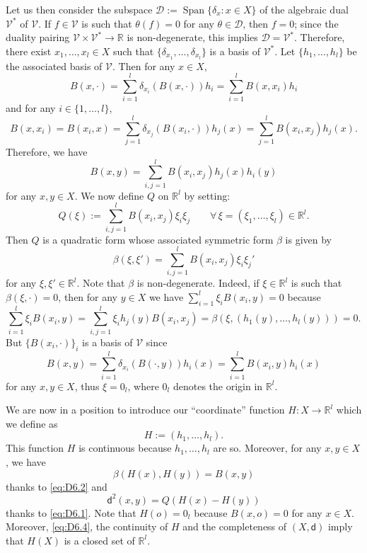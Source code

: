 \documentclass[10pt]{amsart}
\theoremstyle{plain}
\theoremstyle{definition}
\newcommand{\setR}{\mathbb{R}}
\newcommand{\cV}{\mathcal{V}}
\newcommand{\cD}{\mathcal{D}}
\newcommand{\dist}{\mathsf{d}}
\DeclareMathOperator{\Span}{Span}
\begin{document}
Let us then consider the subspace $\mathcal{D}:=\Span\{\delta_x: x \in X\}$ of the algebraic dual~$\cV^*$ of $\cV$. If $f \in \cV$ is such that $\theta(f)=0$ for any $\theta \in \cD$, then $f=0$; since the duality pairing $\cV\times\cV^* \to\setR$ is non-degenerate, this implies $\cD = \cV^*$. Therefore, there exist $x_1,\dots, x_l \in X$ such that $\{\delta_{x_1},\dots,\delta_{x_l}\}$ is a basis of $\mathcal{V}^*$. Let $\{h_1,\dots,h_l\}$ be the associated basis of $\mathcal{V}$. Then for any $x \in X$,
\begin{equation}\label{eq:basis}
B(x,\cdot) = \sum_{i=1}^l \delta_{x_i}(B(x,\cdot)) h_i = \sum_{i=1}^l B(x,x_i) h_i
\end{equation}
and for any $i \in \{1,\dots,l\}$,
\[
B(x,x_i) = B(x_i,x) = \sum_{j=1}^l \delta_{x_j}(B(x_i,\cdot)) h_j(x)= \sum_{j=1}^l B(x_i,x_j)h_j(x).
\]
Therefore, we have
\begin{equation}\label{eq:D6.2}
B(x,y) = \sum_{i,j=1}^l B(x_i,x_j)h_j(x)h_i(y)
\end{equation}
for any $x,y \in X$. We now define $Q$ on $\setR^l$ by setting:
\[
Q(\xi):= \sum_{i,j=1}^lB(x_i,x_j)\xi_i \xi_j \qquad \forall \, \xi=(\xi_1,\dots,\xi_l) \in \setR^l.
\]
Then $Q$ is a quadratic form whose associated symmetric form $\beta$ is given by
\[
\beta(\xi,\xi') = \sum_{i,j=1}^l B(x_i,x_j)\xi_i \xi_j'
\]
for any $\xi, \xi' \in \setR^l$. Note that $\beta$ is non-degenerate. Indeed, if $\xi \in \setR^l $ is such that $\beta(\xi,\cdot)=0$, then for any $y \in X$ we have $\sum_{i=1}^l \xi_i B(x_i,y)=0$ because
\[
\sum_{i=1}^l \xi_i B(x_i,y)=\sum_{i,j=1}^l \xi_i h_j(y)B(x_i,x_j)=\beta(\xi,(h_1(y),\ldots,h_l(y)))=0.
\]
But $\{B(x_i,\cdot)\}_i$ is a basis of $\cV$ since
\[
B(x,y)=\sum_{i=1}^l \delta_{x_i}(B(\cdot,y))h_i(x)= \sum_{i=1}^l B(x_i,y)h_i(x)
\]
for any $x,y \in X$, thus $\xi=0_l$, where $0_l$ denotes the origin in $\setR^l$.

We are now in a position to introduce our ``coordinate'' function $H:X\to\setR^l$ which we define as
\[
H:=(h_1,\dots,h_l).
\]
This function $H$ is continuous because $h_1,\dots,h_l$ are so. Moreover, for any $x,y \in X$, we have
\begin{equation}\label{eq:D6.3}
\beta(H(x),H(y)) = B(x,y)
\end{equation}
thanks to \eqref{eq:D6.2} and
\begin{equation}\label{eq:D6.4}
\dist^2(x,y) = Q(H(x)-H(y))
\end{equation}
thanks to \eqref{eq:D6.1}. Note that $H(o)=0_l$ because $B(x,o)=0$ for any $x \in X$. Moreover, \eqref{eq:D6.4}, the continuity of $H$ and the completeness of $(X,\dist)$ imply that $H(X)$ is a closed set of $\setR^l$.
\end{document}
